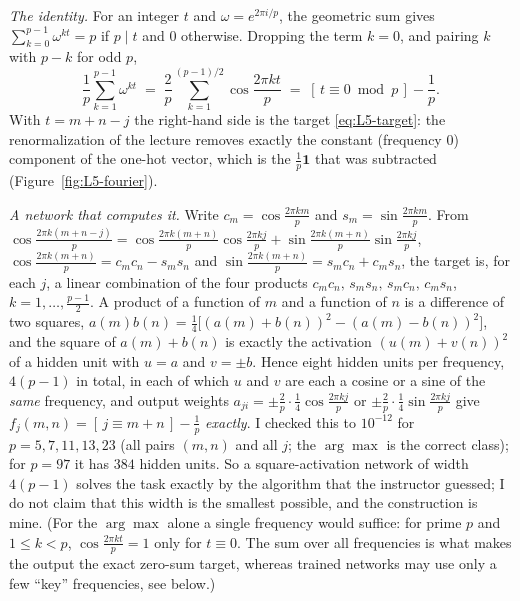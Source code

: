 \begin{beyond}
\emph{The identity.} For an integer $t$ and $\omega=e^{2\pi i/p}$, the geometric sum gives $\sum_{k=0}^{p-1}\omega^{kt}=p$ if $p\mid t$ and $0$ otherwise. Dropping the term $k=0$, and pairing $k$ with $p-k$ for odd $p$,
\[
  \frac1p\sum_{k=1}^{p-1}\omega^{kt}\;=\;\frac2p\sum_{k=1}^{(p-1)/2}\cos\frac{2\pi kt}p\;=\;[\,t\equiv0\bmod p\,]-\frac1p .
\]
With $t=m+n-j$ the right-hand side is the target \eqref{eq:L5-target}: the renormalization of the lecture removes exactly the constant (frequency $0$) component of the one-hot vector, which is the $\frac1p\mathbf1$ that was subtracted (Figure~\ref{fig:L5-fourier}).

\emph{A network that computes it.} Write $c_m=\cos\frac{2\pi km}p$ and $s_m=\sin\frac{2\pi km}p$. From $\cos\frac{2\pi k(m+n-j)}p=\cos\frac{2\pi k(m+n)}p\cos\frac{2\pi kj}p+\sin\frac{2\pi k(m+n)}p\sin\frac{2\pi kj}p$, $\cos\frac{2\pi k(m+n)}p=c_mc_n-s_ms_n$ and $\sin\frac{2\pi k(m+n)}p=s_mc_n+c_ms_n$, the target is, for each $j$, a linear combination of the four products $c_mc_n,\,s_ms_n,\,s_mc_n,\,c_ms_n$, $k=1,\dots,\frac{p-1}2$. A product of a function of $m$ and a function of $n$ is a difference of two squares, $a(m)b(n)=\frac14\big[(a(m)+b(n))^2-(a(m)-b(n))^2\big]$, and the square of $a(m)+b(n)$ is exactly the activation $(u(m)+v(n))^2$ of a hidden unit with $u=a$ and $v=\pm b$. Hence eight hidden units per frequency, $4(p-1)$ in total, in each of which $u$ and $v$ are each a cosine or a sine of the \emph{same} frequency, and output weights $a_{ji}=\pm\frac2p\cdot\frac14\cos\frac{2\pi kj}p$ or $\pm\frac2p\cdot\frac14\sin\frac{2\pi kj}p$ give $f_j(m,n)=[\,j\equiv m+n\,]-\frac1p$ \emph{exactly}. I checked this to $10^{-12}$ for $p=5,7,11,13,23$ (all pairs $(m,n)$ and all $j$; the $\arg\max$ is the correct class); for $p=97$ it has $384$ hidden units. So a square-activation network of width $4(p-1)$ solves the task exactly by the algorithm that the instructor guessed; I do not claim that this width is the smallest possible, and the construction is mine. (For the $\arg\max$ alone a single frequency would suffice: for prime $p$ and $1\le k<p$, $\cos\frac{2\pi kt}p=1$ only for $t\equiv0$. The sum over all frequencies is what makes the output the exact zero-sum target, whereas trained networks may use only a few ``key'' frequencies, see below.)


\end{beyond}
